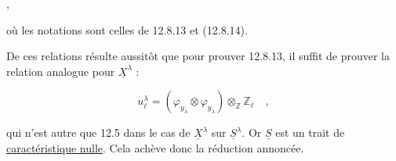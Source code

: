 \begin{center}
 \qquad ,
\end{center}
où les notations sont celles de 12.8.13 et (12.8.14).

De ces relations résulte aussitôt que pour prouver 12.8.13, il suffit de prouver la relation analogue pour $\underline{X}^{\lambda}$ :

\begin{equation*}
u^{\lambda}_{\ell} = (\varphi_{y_{\lambda}} \otimes \varphi_{y_{\lambda}}) \otimes_{\mathbb{Z}} \mathbb{Z}_{\ell} \quad ,
\end{equation*}


qui n'est autre que 12.5 dans le cas de $\underline{X}^{\lambda}$ sur $\underline{S}^{\lambda}$. Or $\underline{S}$ est un trait de \underline{caractéristique nulle}. Cela achève donc la réduction annoncée.

